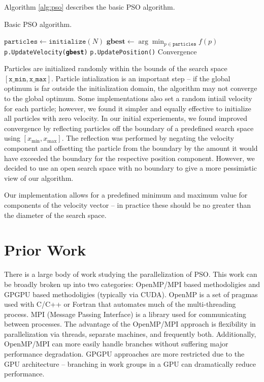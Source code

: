 Algorithm \ref{alg:pso} describes the basic PSO algorithm.

\begin{algorithm}
  \caption{Basic PSO algorithm.}\label{alg:pso}
  \begin{algorithmic}[1]
    \State $\texttt{particles} \gets \texttt{initialize}(N)$
    \Repeat
    \State $\textbf{gbest} \gets \arg\min_{p\in\texttt{particles}}f(p)$
    \State \texttt{p.UpdateVelocity(\textbf{gbest})}
    \State \texttt{p.UpdatePosition()}
    \EndFor
    \Until Convergence
    \EndProcedure
  \end{algorithmic}
\end{algorithm}

Particles are initialized randomly within the bounds of the search space
$[\texttt{x\_min}, \texttt{x\_max}]$. Particle intialization is an important
step -- if the global optimum is far outside the initialization domain, the
algorithm may not converge to the global optimum.
Some implementations also set a random
intiail velocity for each particle; however, we found it simpler and equally
effective to initialize all particles with zero velocity. In our initial
experiements, we found improved convergence by reflecting particles off the
boundary of a predefined search space using $[x_{\min}, x_{\max}]$. The
reflection was performed by negating the velocity component and offsetting the
particle from the boundary by the amount it would have exceeded the boundary for
the respective position component.
However, we decided to use an open search space with no boundary to give a more
pessimistic view of our algorithm.

Our implementation allows for a predefined minimum and maximum value for
components of the velocity vector -- in practice these should be no greater than
the diameter of the search space.

\section{Prior Work}\label{sec:prior}
There is a large body of work studying the parallelization of PSO. This work can
be broadly broken up into two categories: OpenMP/MPI based methodoligies and
GPGPU based methodoligies (typically via CUDA). OpenMP is a set of pragmas used
with C/C++ or Fortran that automates much of the multi-threading process. MPI
(Message Passing Interface) is a library used for communicating between processes.
The advantage of the OpenMP/MPI
approach is flexibility in parallelization via threads, separate machines, and
frequently both. Additionally, OpenMP/MPI can more easily handle branches
without suffering major performance degradation.
GPGPU approaches are more restricted due to the GPU architecture
-- branching in work groups in a GPU can dramatically reduce performance.\par

